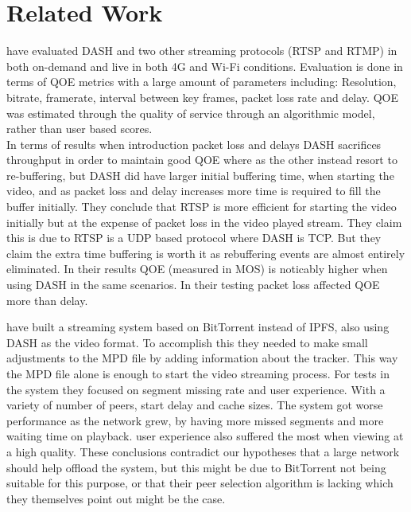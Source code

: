 \chapter{Related Work}
\label{cha:related-work}
\citeauthor{aloman2015performance} \cite{aloman2015performance} have evaluated \acs{DASH} and two other streaming protocols (\acs{RTSP} and \acs{RTMP}) in both on-demand and live in both 4G and Wi-Fi conditions. Evaluation is done in terms of \ac{QOE} metrics with a large amount of parameters including: Resolution, bitrate, framerate, interval between key frames, packet loss rate and delay. \acs{QOE} was estimated through the quality of service through an algorithmic model, rather than user based scores.\\
In terms of results when introduction packet loss and delays \acs{DASH} sacrifices throughput in order to maintain good \acs{QOE} where as the other instead resort to re-buffering, but \acs{DASH} did have larger initial buffering time, when starting the video, and as packet loss and delay increases more time is required to fill the buffer initially. They conclude that \acs{RTSP} is more efficient for starting the video initially but at the expense of packet loss in the video played stream. They claim this is due to \acs{RTSP} is a UDP based protocol where \acs{DASH} is TCP. But they claim the extra time buffering is worth it as rebuffering events are almost entirely eliminated. In their results \acs{QOE} (measured in MOS) is noticably higher when using \acs{DASH} in the same scenarios. In their testing packet loss affected \acs{QOE} more than delay.




\citeauthor{gazdar2017toward} \cite{gazdar2017toward} have built a streaming system based on BitTorrent instead of \acs{IPFS}, also using \acs{DASH} as the video format. To accomplish this they needed to make small adjustments to the \acs{MPD} file by adding information about the tracker. This way the \acs{MPD} file alone is enough to start the video streaming process. For tests in the system they focused on segment missing rate and user experience. With a variety of number of peers, start delay and cache sizes. The system got worse performance as the network grew, by having more missed segments and more waiting time on playback. user experience also suffered the most when viewing at a high quality. These conclusions contradict our hypotheses that a large network should help offload the system, but this might be due to BitTorrent not being suitable for this purpose, or that their peer selection algorithm is lacking which they themselves point out might be the case.



